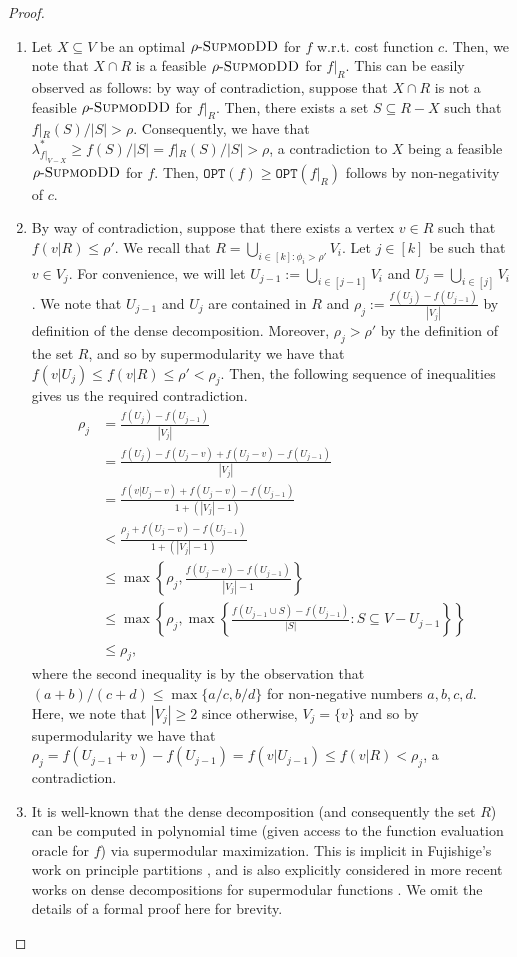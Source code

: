 \documentclass{article}
\newcommand{\OPT}{\ensuremath{\mathtt{OPT}}\xspace}
\newcommand{\sdds}{\ensuremath{\textsc{SupmodDD}}\xspace}
\newcommand{\rhosdds}[1]{\ensuremath{#1\text{-}\sdds}}
\begin{document}
\begin{proof}
\begin{enumerate}
    \item Let $X\subseteq V$ be an optimal $\rhosdds{\rho}$ for $f$ w.r.t. cost function $c$. Then, we note that $X\cap R$ is a feasible $\rhosdds{\rho}$ for $f|_{R}$. This can be easily observed as follows: by way of contradiction, suppose that $X\cap R$ is not a feasible $\rhosdds{\rho}$ for $f|_{R}$. Then, there exists a set $S \subseteq R - X$ such that $f|_{R}(S)/|S| > \rho$. Consequently, we have that $\lambda^*_{f|_{V - X}} \geq f(S)/|S| =  f|_{R}(S)/|S| > \rho$, a contradiction to $X$ being a feasible \rhosdds{\rho} for $f$. Then, $\OPT(f) \geq \OPT(f|_R)$ follows by non-negativity of $c$. 
        \item By way of contradiction, suppose that there exists a vertex $v \in R$ such that $f(v|R) \leq \rho'$. We recall that $R = \bigcup_{i \in [k] : \phi_i > \rho'}V_i$. Let $j \in [k]$ be such that $v \in V_j$.
        For convenience, we will let $U_{j-1} := \bigcup_{i \in [j-1]}V_i$ and $U_{j} =  \bigcup_{i \in [j]}V_i$. We note that $U_{j-1}$ and $U_j$ are contained in $R$ and $\rho_j := \frac{f(U_j) - f(U_{j-1})}{|V_j|}$ by definition of the dense decomposition. Moreover, $\rho_j > \rho'$ by the definition of the set $R$, and so by supermodularity we have that $f(v|U_j) \leq f(v|R) \leq \rho' < \rho_j$. Then, the following sequence of inequalities gives us the required contradiction.
        \begin{align*}
            \rho_j & = \frac{f(U_j) - f(U_{j-1})}{|V_j|}\\
            & = \frac{f(U_j) - f(U_j - v) + f(U_j - v) -  f(U_{j-1})}{|V_j| }\\
            & = \frac{f(v|U_j - v) + f(U_j - v) -  f(U_{j-1})}{1 + (|V_j| - 1)}\\
            & < \frac{\rho_j + f(U_j - v) -  f(U_{j-1})}{1 + (|V_j| - 1)}\\
            & \leq  \max\left\{\rho_j, \frac{f(U_j - v) -  f(U_{j-1})}{|V_j| - 1}\right\}\\
            & \leq \max\left\{\rho_j, \max\left\{\frac{f(U_{j-1} \cup S) - f(U_{j-1})}{|S|} : S\subseteq V - U_{j-1} \right\}\right\}\\
            & \leq \rho_j,
        \end{align*}
        where the second inequality is by the observation that $(a+b)/(c+d) \leq \max\{a/c, b/d\}$ for non-negative numbers $a,b,c,d$. Here, we note that $|V_j| \geq 2$ since otherwise, $V_j = \{v\}$ and so by supermodularity we have that $\rho_j = f(U_{j-1} + v) - f(U_{j-1}) = f(v |U_{j-1}) \leq f(v|R) < \rho_j$, 
a contradiction.
        \item It is well-known that the dense decomposition (and consequently the set $R$) can be computed in polynomial time (given access to the function evaluation oracle for  $f$) via supermodular maximization. This is implicit in Fujishige's work on principle partitions \cite{Fujishige_1980}, and is also explicitly considered in more recent works on dense decompositions for supermodular functions \cite{hqc-22}. We omit the details of a formal proof here for brevity. 
    \end{enumerate}
\end{proof}
\end{document}

